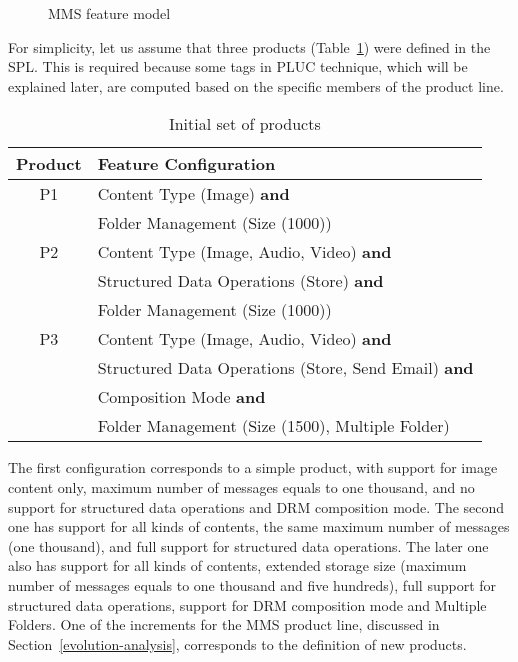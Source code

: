 \documentclass{acm_proc_article-sp}
\begin{document}
\begin{figure*}
\centering
{}
\caption{MMS feature model}
\label{mms-feature-model}
\end{figure*}

For simplicity, let us assume that three products (Table~\ref{tab:initial-products}) were defined in the SPL. 
This is required because some tags in PLUC technique, which will be explained later, are computed based on the specific members 
of the product line. 

\begin{table}[hb]
\centering
\caption{Initial set of products}
\label{tab:initial-products}
\begin{small}
\begin{tabular}{|c|l|} \hline
Product & Feature Configuration \\ \hline
P1  & Content Type (Image) {\bf and} \\ 
      & Folder Management (Size (1000))\\ \hline
P2  & Content Type (Image, Audio, Video) {\bf and} \\ 
      & Structured Data Operations (Store) {\bf and} \\ 
      & Folder Management (Size (1000))  \\ \hline
P3  & Content Type (Image, Audio, Video) {\bf and} \\ 
      & Structured Data Operations (Store, Send Email) {\bf and}\\
      & Composition Mode {\bf and} \\
      & Folder Management (Size (1500), Multiple Folder)  \\ \hline 
\end{tabular}
\end{small}
\end{table}

The first configuration corresponds to a simple product, with support for image content only, maximum number of messages equals to one thousand, and no support for structured data operations and DRM composition mode. The second one has support for all kinds of contents, the same maximum number of messages (one thousand), and full support for structured data operations. The later one also has support for all kinds of contents, extended storage size (maximum number of messages equals to one thousand and five hundreds), full support for structured data operations, support for DRM composition mode and Multiple Folders. One of the increments for the MMS product line, discussed in Section~\ref{evolution-analysis}, corresponds to the definition of new products. 
\end{document}
